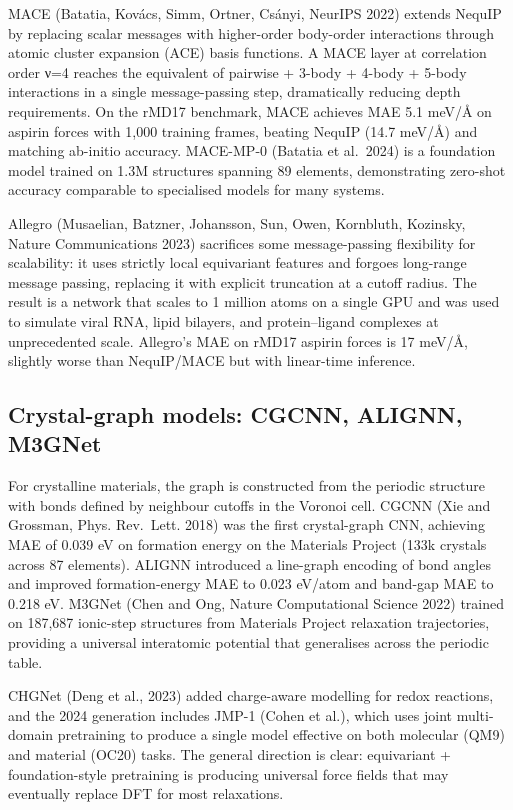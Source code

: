 \documentclass{article}
\begin{document}
MACE (Batatia, Kovács, Simm, Ortner, Csányi, NeurIPS 2022) extends NequIP by replacing scalar messages with higher-order body-order interactions through atomic cluster expansion (ACE) basis functions. A MACE layer at correlation order ν=4 reaches the equivalent of pairwise + 3-body + 4-body + 5-body interactions in a single message-passing step, dramatically reducing depth requirements. On the rMD17 benchmark, MACE achieves MAE 5.1 meV/Å on aspirin forces with 1,000 training frames, beating NequIP (14.7 meV/Å) and matching ab-initio accuracy. MACE-MP-0 (Batatia et al.~2024) is a foundation model trained on 1.3M structures spanning 89 elements, demonstrating zero-shot accuracy comparable to specialised models for many systems.

Allegro (Musaelian, Batzner, Johansson, Sun, Owen, Kornbluth, Kozinsky, Nature Communications 2023) sacrifices some message-passing flexibility for scalability: it uses strictly local equivariant features and forgoes long-range message passing, replacing it with explicit truncation at a cutoff radius. The result is a network that scales to 1 million atoms on a single GPU and was used to simulate viral RNA, lipid bilayers, and protein--ligand complexes at unprecedented scale. Allegro's MAE on rMD17 aspirin forces is 17 meV/Å, slightly worse than NequIP/MACE but with linear-time inference.

\subsection{Crystal-graph models: CGCNN, ALIGNN, M3GNet}\label{crystal-graph-models-cgcnn-alignn-m3gnet}

For crystalline materials, the graph is constructed from the periodic structure with bonds defined by neighbour cutoffs in the Voronoi cell. CGCNN (Xie and Grossman, Phys. Rev.~Lett. 2018) was the first crystal-graph CNN, achieving MAE of 0.039 eV on formation energy on the Materials Project (133k crystals across 87 elements). ALIGNN \citep{choudhary2021atomisticlinegraph} introduced a line-graph encoding of bond angles and improved formation-energy MAE to 0.023 eV/atom and band-gap MAE to 0.218 eV. M3GNet (Chen and Ong, Nature Computational Science 2022) trained on 187,687 ionic-step structures from Materials Project relaxation trajectories, providing a universal interatomic potential that generalises across the periodic table.

CHGNet (Deng et al., 2023) added charge-aware modelling for redox reactions, and the 2024 generation includes JMP-1 (Cohen et al.), which uses joint multi-domain pretraining to produce a single model effective on both molecular (QM9) and material (OC20) tasks. The general direction is clear: equivariant + foundation-style pretraining is producing universal force fields that may eventually replace DFT for most relaxations.
\end{document}
